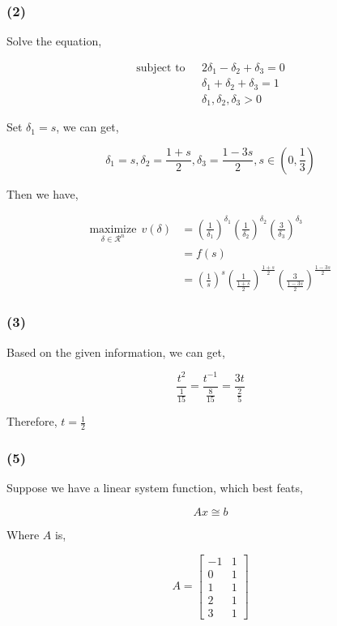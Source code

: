\documentclass{article}
\begin{document}
\subsubsection*{(2)}

Solve the equation, 

\[
\begin{split}
\text{subject to}\ \ \ & 2\delta_1 - \delta_2 + \delta_3 = 0 \\ 
& \delta_1 + \delta_2 + \delta_3 = 1 \\
& \delta_1, \delta_2, \delta_3 > 0
\end{split}
\]

Set $\delta_1 = s$, we can get,

$$\delta_1 = s, \delta_2 = \frac{1 + s}{2}, \delta_3 = \frac{1 - 3s}{2}, s\in (0, \frac{1}{3})$$

Then we have,

\[
\begin{split}
\underset{\delta \in \mathcal{R}^n}{\text{maximize}} \ \  v(\delta) &= \left(\frac{1}{\delta_1}\right)^{\delta_1}\left(\frac{1}{\delta_2}\right)^{\delta_2}\left(\frac{3}{\delta_3}\right)^{\delta_3} \\
& = f(s)\\ 
& = \left(\frac{1}{s}\right)^{s}\left(\frac{1}{\frac{1 + s}{2}}\right)^{\frac{1 + s}{2}}\left(\frac{3}{ \frac{1 - 3s}{2}}\right)^{ \frac{1 - 3s}{2}} 
\end{split}
\]


\subsubsection*{(3)}

Based on the given information, we can get,

$$\frac{t^2}{\frac{1}{15}} = \frac{t^{-1}}{\frac{8}{15}} = \frac{3t}{\frac{2}{5}}$$

Therefore, $t = \frac{1}{2}$

\subsubsection*{(5)}

Suppose we have a linear system function, which best feats,

$$Ax \cong b$$

Where $A$ is,

$$A =\begin{bmatrix} -1 & 1\\ 0 &1\\ 1&1\\ 2&1\\3&1 \end{bmatrix}$$
\end{document}

